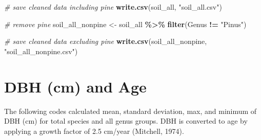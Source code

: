 \documentclass[
]{article}
\newenvironment{Shaded}{\begin{snugshade}}{\end{snugshade}}
\newcommand{\CommentTok}[1]{\textcolor[rgb]{0.56,0.35,0.01}{\textit{#1}}}
\newcommand{\FunctionTok}[1]{\textcolor[rgb]{0.13,0.29,0.53}{\textbf{#1}}}
\newcommand{\NormalTok}[1]{#1}
\newcommand{\OtherTok}[1]{\textcolor[rgb]{0.56,0.35,0.01}{#1}}
\newcommand{\SpecialCharTok}[1]{\textcolor[rgb]{0.81,0.36,0.00}{\textbf{#1}}}
\newcommand{\StringTok}[1]{\textcolor[rgb]{0.31,0.60,0.02}{#1}}
\begin{document}
\begin{Shaded}
\begin{Highlighting}[]
\CommentTok{\# save cleaned data including pine }
\FunctionTok{write.csv}\NormalTok{(soil\_all, }\StringTok{"soil\_all.csv"}\NormalTok{)}

\CommentTok{\# remove pine}
\NormalTok{soil\_all\_nonpine }\OtherTok{\textless{}{-}}\NormalTok{ soil\_all }\SpecialCharTok{\%\textgreater{}\%} 
  \FunctionTok{filter}\NormalTok{(Genus }\SpecialCharTok{!=} \StringTok{"Pinus"}\NormalTok{) }

\CommentTok{\# save cleaned data excluding pine }
\FunctionTok{write.csv}\NormalTok{(soil\_all\_nonpine, }\StringTok{"soil\_all\_nonpine.csv"}\NormalTok{)}
\end{Highlighting}
\end{Shaded}

\section{DBH (cm) and Age}\label{dbh-cm-and-age}

The following codes calculated mean, standard deviation, max, and
minimum of DBH (cm) for total species and all genus groups. DBH is
converted to age by applying a growth factor of 2.5 cm/year (Mitchell,
1974).
\end{document}
